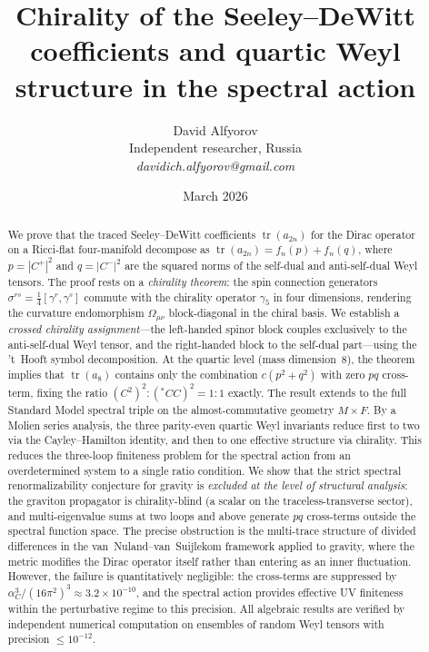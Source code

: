 \documentclass[12pt,a4paper]{article}
\theoremstyle{definition}
\theoremstyle{remark}
\newcommand{\tr}{\operatorname{tr}}
\begin{document}
\title{Chirality of the Seeley--DeWitt coefficients and quartic Weyl
structure in the spectral action}

\author{David Alfyorov\\[4pt]
\small Independent researcher, Russia\\[2pt]
\small\textit{davidich.alfyorov@gmail.com}}

\date{March 2026}

\maketitle

\begin{abstract}

We prove that the traced Seeley--DeWitt coefficients $\tr(a_{2n})$ for the
Dirac operator on a Ricci-flat four-manifold decompose as
$\tr(a_{2n}) = f_n(p) + f_n(q)$, where $p = |C^+|^2$ and $q = |C^-|^2$
are the squared norms of the self-dual and anti-self-dual Weyl tensors.
The proof rests on a \emph{chirality theorem}: the spin connection generators
$\sigma^{rs} = \frac{1}{4}[\gamma^r, \gamma^s]$ commute with the chirality
operator $\gamma_5$ in four dimensions, rendering the curvature endomorphism
$\Omega_{\mu\nu}$ block-diagonal in the chiral basis.  We establish a
\emph{crossed chirality assignment}---the left-handed spinor block couples
exclusively to the anti-self-dual Weyl tensor, and the right-handed block to
the self-dual part---using the 't~Hooft symbol decomposition.  At the quartic
level (mass dimension~8), the theorem implies that $\tr(a_8)$ contains only
the combination $c(p^2 + q^2)$ with zero $pq$ cross-term, fixing the ratio
$(C^2)^2 : (\!{}^{\ast}\!CC)^2 = 1{:}1$ exactly.  The result extends to the full
Standard Model spectral triple on the almost-commutative geometry $M \times F$.
By a Molien series analysis, the three parity-even quartic Weyl invariants
reduce first to two via the Cayley--Hamilton identity, and then to one
effective structure via chirality.  This reduces the three-loop finiteness
problem for the spectral action from an overdetermined system to a single
ratio condition.  We show that the strict spectral renormalizability conjecture
for gravity is \emph{excluded at the level of structural analysis}: the graviton propagator is chirality-blind
(a scalar on the traceless-transverse sector), and multi-eigenvalue sums at two
loops and above generate $pq$ cross-terms outside the spectral function space.
The precise obstruction is the multi-trace structure of divided differences in
the van~Nuland--van~Suijlekom framework applied to gravity, where the metric
modifies the Dirac operator itself rather than entering as an inner fluctuation.
However, the failure is quantitatively negligible: the cross-terms are
suppressed by $\alpha_C^3/(16\pi^2)^3 \approx 3.2 \times 10^{-10}$, and the
spectral action provides effective UV finiteness within the perturbative regime
to this precision.  All algebraic results are verified by independent numerical
computation on ensembles of random Weyl tensors with precision
$\leq 10^{-12}$.
\end{abstract}
\end{document}
